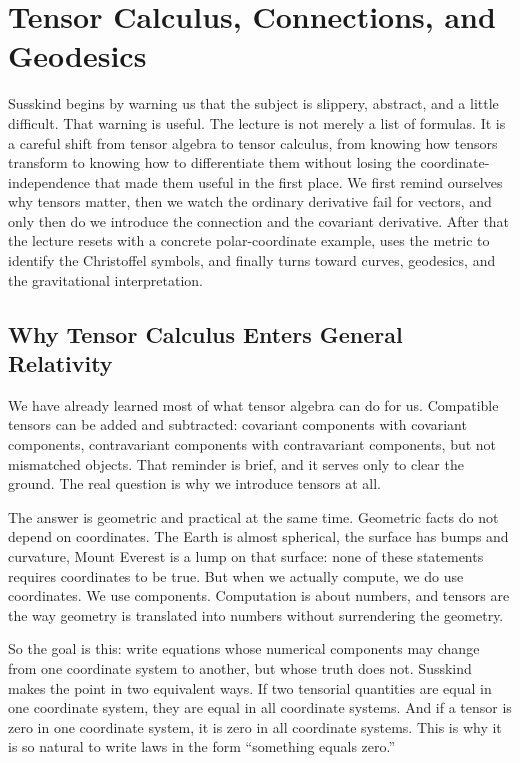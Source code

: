 \chapter{Tensor Calculus, Connections, and Geodesics}

Susskind begins by warning us that the subject is slippery, abstract, and a little difficult. That warning is useful. The lecture is not merely a list of formulas. It is a careful shift from tensor algebra to tensor calculus, from knowing how tensors transform to knowing how to differentiate them without losing the coordinate-independence that made them useful in the first place. We first remind ourselves why tensors matter, then we watch the ordinary derivative fail for vectors, and only then do we introduce the connection and the covariant derivative. After that the lecture resets with a concrete polar-coordinate example, uses the metric to identify the Christoffel symbols, and finally turns toward curves, geodesics, and the gravitational interpretation.

\section{Why Tensor Calculus Enters General Relativity}

We have already learned most of what tensor algebra can do for us. Compatible tensors can be added and subtracted: covariant components with covariant components, contravariant components with contravariant components, but not mismatched objects. That reminder is brief, and it serves only to clear the ground. The real question is why we introduce tensors at all.

The answer is geometric and practical at the same time. Geometric facts do not depend on coordinates. The Earth is almost spherical, the surface has bumps and curvature, Mount Everest is a lump on that surface: none of these statements requires coordinates to be true. But when we actually compute, we do use coordinates. We use components. Computation is about numbers, and tensors are the way geometry is translated into numbers without surrendering the geometry.

So the goal is this: write equations whose numerical components may change from one coordinate system to another, but whose truth does not. Susskind makes the point in two equivalent ways. If two tensorial quantities are equal in one coordinate system, they are equal in all coordinate systems. And if a tensor is zero in one coordinate system, it is zero in all coordinate systems. This is why it is so natural to write laws in the form ``something equals zero.''

